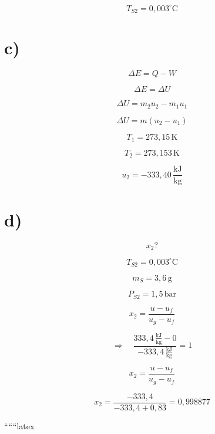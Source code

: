 \[ T_{S2} = 0,003^\circ \text{C} \]

\section*{c)}

\[
\Delta E = Q - W
\]

\[
\Delta E = \Delta U
\]

\[
\Delta U = m_2 u_2 - m_1 u_1
\]

\[
\Delta U = m (u_2 - u_1)
\]

\[
T_1 = 273,15 \, \text{K}
\]

\[
T_2 = 273,153 \, \text{K}
\]

\[
u_2 = -333,40 \, \frac{\text{kJ}}{\text{kg}}
\]

\section*{d)}

\[ x_2 ? \]

\[ T_{S2} = 0,003^\circ \text{C} \]

\[ m_S = 3,6 \, \text{g} \]

\[ P_{S2} = 1,5 \, \text{bar} \]

\[
x_2 = \frac{u - u_f}{u_g - u_f}
\]

\[
\Rightarrow \quad \frac{333,4 \, \frac{\text{kJ}}{\text{kg}} - 0}{-333,4 \, \frac{\text{kJ}}{\text{kg}}} = 1
\]

\[
x_2 = \frac{u - u_f}{u_g - u_f}
\]

\[
x_2 = \frac{-333,4}{-333,4 + 0,83} = 0,998877
\]

``````latex


